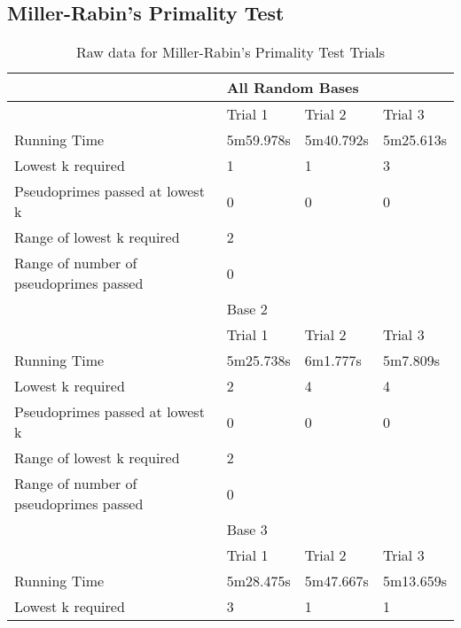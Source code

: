 \documentclass{article}
\begin{document}
\begin{appendices}
\subsection{Miller-Rabin's Primality Test}
\FloatBarrier
\begin{table}[h]
\caption{Raw data for Miller-Rabin's Primality Test Trials}
\label{table:mr}
\begin{tabular}{@{}llll@{}}
\toprule
                                       & \multicolumn{3}{l}{All Random Bases}  \\ \midrule
                                       & Trial 1     & Trial 2    & Trial 3    \\
Running Time                           & 5m59.978s   & 5m40.792s  & 5m25.613s  \\
Lowest k required                      & 1           & 1          & 3          \\
Pseudoprimes passed at lowest k        & 0           & 0          & 0          \\\cmidrule(lr){2-4}
Range of lowest k required             & \multicolumn{3}{l}{2}                 \\
Range of number of pseudoprimes passed & \multicolumn{3}{l}{0}                 \\\midrule
                                       & \multicolumn{3}{l}{Base 2}            \\\midrule
                                       & Trial 1     & Trial 2    & Trial 3    \\
Running Time                           & 5m25.738s   & 6m1.777s   & 5m7.809s   \\
Lowest k required                      & 2           & 4          & 4          \\
Pseudoprimes passed at lowest k        & 0           & 0          & 0          \\\cmidrule(lr){2-4}
Range of lowest k required             & \multicolumn{3}{l}{2}                 \\
Range of number of pseudoprimes passed & \multicolumn{3}{l}{0}                 \\\midrule
                                       & \multicolumn{3}{l}{Base 3}            \\\midrule
                                       & Trial 1     & Trial 2    & Trial 3    \\
Running Time                           & 5m28.475s   & 5m47.667s  & 5m13.659s  \\
Lowest k required                      & 3           & 1          & 1          \\

\end{tabular}
\end{table}
\end{appendices}
\end{document}
